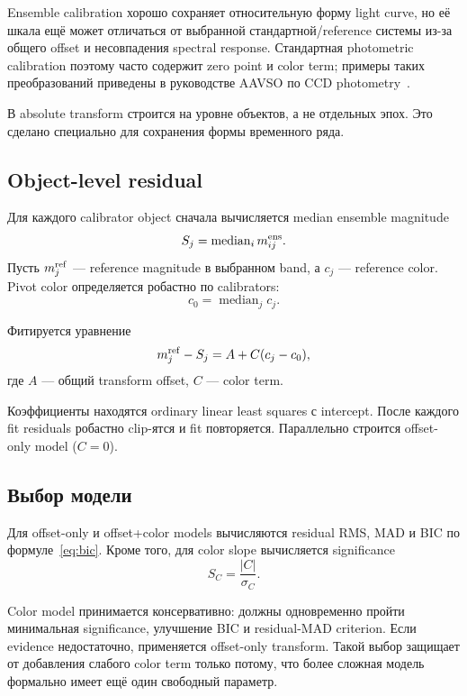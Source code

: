 Ensemble calibration хорошо сохраняет относительную форму light curve, но её шкала ещё может отличаться от выбранной стандартной/reference системы из-за общего offset и несовпадения spectral response. Стандартная photometric calibration поэтому часто содержит zero point и color term; примеры таких преобразований приведены в руководстве AAVSO по CCD photometry~\cite{aavso_ccd}.

В \program{} absolute transform строится на уровне объектов, а не отдельных эпох. Это сделано специально для сохранения формы временного ряда.

\subsection{Object-level residual}

Для каждого calibrator object сначала вычисляется median ensemble magnitude
\begin{equation}
  S_j=\operatorname{median}_i m^{\rm ens}_{ij}.
\end{equation}
Пусть $m^{\rm ref}_j$ --- reference magnitude в выбранном band, а $c_j$ --- reference color. Pivot color определяется робастно по calibrators:
\begin{equation}
  c_0=\operatorname{median}_j c_j.
\end{equation}

Фитируется уравнение
\begin{equation}
  m^{\rm ref}_j-S_j=A+C(c_j-c_0),
  \label{eq:color-transform-fit}
\end{equation}
где $A$ --- общий transform offset, $C$ --- color term.

Коэффициенты находятся ordinary linear least squares с intercept. После каждого fit residuals робастно clip-ятся и fit повторяется. Параллельно строится offset-only model ($C=0$).

\subsection{Выбор модели}

Для offset-only и offset+color models вычисляются residual RMS, MAD и BIC по формуле~\eqref{eq:bic}. Кроме того, для color slope вычисляется significance
\begin{equation}
  S_C=\frac{|C|}{\sigma_C}.
\end{equation}

Color model принимается консервативно: должны одновременно пройти минимальная significance, улучшение BIC и residual-MAD criterion. Если evidence недостаточно, применяется offset-only transform. Такой выбор защищает от добавления слабого color term только потому, что более сложная модель формально имеет ещё один свободный параметр.

